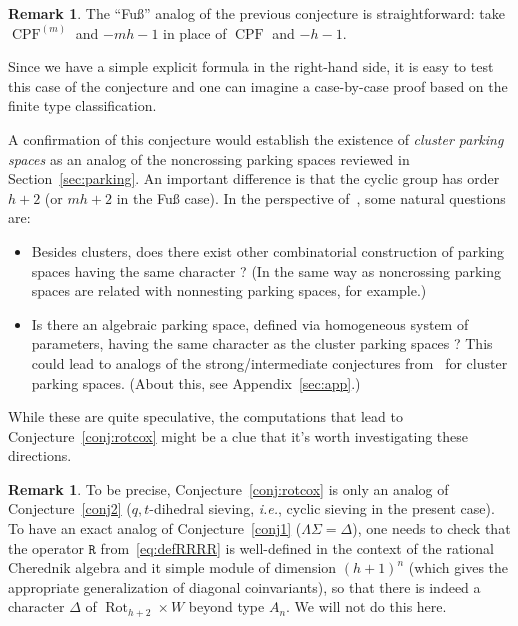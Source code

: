 \documentclass[11pt]{article}
\theoremstyle{definition}
\newtheorem{rema}[theo]{Remark}
\DeclareMathOperator{\rot}{Rot}
\newcommand{\RRRR}{\mathtt{R}}
\DeclareMathOperator{\CPF}{CPF}
\begin{document}
\begin{rema}
    The ``Fuß'' analog of the previous conjecture is straightforward: take $\CPF^{(m)}$ and $-mh-1$ in place of $\CPF$ and $-h-1$.
\end{rema}

Since we have a simple explicit formula in the right-hand side, it is easy to test this case of the conjecture and one can imagine a case-by-case proof based on the finite type classification.

A confirmation of this conjecture would establish the existence of {\it cluster parking spaces} as an analog of the noncrossing parking spaces reviewed in Section~\ref{sec:parking}.  An important difference is that the cyclic group has order $h+2$ (or $mh+2$ in the Fuß case).  In the perspective of~\cite{armstrongreinerrhoades}, some natural questions are:
\begin{itemize}
    \item Besides clusters, does there exist other combinatorial construction of parking spaces having the same character ?  (In the same way as noncrossing parking spaces are related with nonnesting parking spaces, for example.)
    \item Is there an algebraic parking space, defined via homogeneous system of parameters, having the same character as the cluster parking spaces ?  This could lead to analogs of the strong/intermediate conjectures from~\cite{armstrongreinerrhoades} for cluster parking spaces. (About this, see Appendix~\ref{sec:app}.)
\end{itemize}

While these are quite speculative, the computations that lead to Conjecture~\ref{conj:rotcox} might be a clue that it's worth investigating these directions.

\begin{rema}
    To be precise, Conjecture~\ref{conj:rotcox} is only an analog of Conjecture~\ref{conj2} ($q,t$-dihedral sieving, {\it i.e.}, cyclic sieving in the present case).  To have an exact analog of Conjecture~\ref{conj1} ($\Lambda\Sigma=\Delta$), one needs to check that the operator $\RRRR$ from~\eqref{eq:defRRRR} is well-defined in the context of the rational Cherednik algebra and it simple module of dimension $(h+1)^n$ (which gives the appropriate generalization of diagonal coinvariants), so that there is indeed a character $\Delta$ of $\rot_{h+2}\times W$ beyond type $A_n$.  We will not do this here.
\end{rema}
\end{document}
